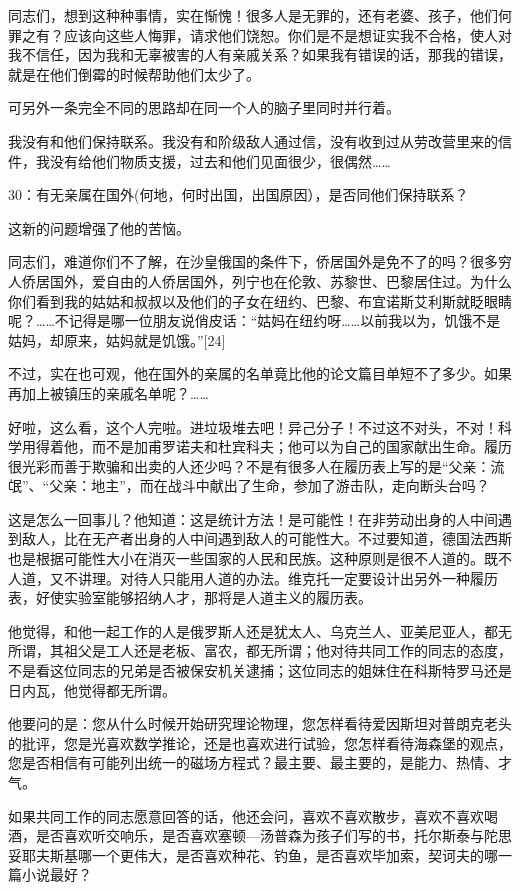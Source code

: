 同志们，想到这种种事情，实在惭愧！很多人是无罪的，还有老婆、孩子，他们何罪之有？应该向这些人悔罪，请求他们饶恕。你们是不是想证实我不合格，使人对我不信任，因为我和无辜被害的人有亲戚关系？如果我有错误的话，那我的错误，就是在他们倒霉的时候帮助他们太少了。

可另外一条完全不同的思路却在同一个人的脑子里同时并行着。

我没有和他们保持联系。我没有和阶级敌人通过信，没有收到过从劳改营里来的信件，我没有给他们物质支援，过去和他们见面很少，很偶然……

30：有无亲属在国外(何地，何时出国，出国原因），是否同他们保持联系？

这新的问题增强了他的苦恼。

同志们，难道你们不了解，在沙皇俄国的条件下，侨居国外是免不了的吗？很多穷人侨居国外，爱自由的人侨居国外，列宁也在伦敦、苏黎世、巴黎居住过。为什么你们看到我的姑姑和叔叔以及他们的子女在纽约、巴黎、布宜诺斯艾利斯就眨眼睛呢？……不记得是哪一位朋友说俏皮话：“姑妈在纽约呀……以前我以为，饥饿不是姑妈，却原来，姑妈就是饥饿。”[24]

不过，实在也可观，他在国外的亲属的名单竟比他的论文篇目单短不了多少。如果再加上被镇压的亲戚名单呢？……

好啦，这么看，这个人完啦。进垃圾堆去吧！异己分子！不过这不对头，不对！科学用得着他，而不是加甫罗诺夫和杜宾科夫；他可以为自己的国家献出生命。履历很光彩而善于欺骗和出卖的人还少吗？不是有很多人在履历表上写的是“父亲：流氓”、“父亲：地主”，而在战斗中献出了生命，参加了游击队，走向断头台吗？

这是怎么一回事儿？他知道：这是统计方法！是可能性！在非劳动出身的人中间遇到敌人，比在无产者出身的人中间遇到敌人的可能性大。不过要知道，德国法西斯也是根据可能性大小在消灭一些国家的人民和民族。这种原则是很不人道的。既不人道，又不讲理。对待人只能用人道的办法。维克托一定要设计出另外一种履历表，好使实验室能够招纳人才，那将是人道主义的履历表。

他觉得，和他一起工作的人是俄罗斯人还是犹太人、乌克兰人、亚美尼亚人，都无所谓，其祖父是工人还是老板、富农，都无所谓；他对待共同工作的同志的态度，不是看这位同志的兄弟是否被保安机关逮捕；这位同志的姐妹住在科斯特罗马还是日内瓦，他觉得都无所谓。

他要问的是：您从什么时候开始研究理论物理，您怎样看待爱因斯坦对普朗克老头的批评，您是光喜欢数学推论，还是也喜欢进行试验，您怎样看待海森堡的观点，您是否相信有可能列出统一的磁场方程式？最主要、最主要的，是能力、热情、才气。

如果共同工作的同志愿意回答的话，他还会问，喜欢不喜欢散步，喜欢不喜欢喝酒，是否喜欢听交响乐，是否喜欢塞顿—汤普森为孩子们写的书，托尔斯泰与陀思妥耶夫斯基哪一个更伟大，是否喜欢种花、钓鱼，是否喜欢毕加索，契诃夫的哪一篇小说最好？

